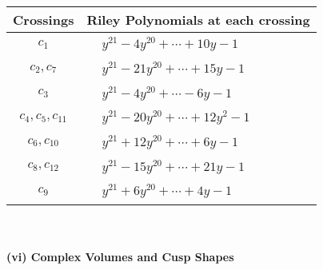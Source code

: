 \documentclass[1p]{elsarticle_modified}
\theoremstyle{definition}
\begin{document}
\begin{tabular}{m{50pt}|m{274pt}}
Crossings & \hspace{64pt}Riley Polynomials at each crossing \\
\hline $$\begin{aligned}c_{1}\end{aligned}$$&$\begin{aligned}
&y^{21}-4 y^{20}+\cdots+10 y-1
\end{aligned}$\\
\hline $$\begin{aligned}c_{2},c_{7}\end{aligned}$$&$\begin{aligned}
&y^{21}-21 y^{20}+\cdots+15 y-1
\end{aligned}$\\
\hline $$\begin{aligned}c_{3}\end{aligned}$$&$\begin{aligned}
&y^{21}-4 y^{20}+\cdots-6 y-1
\end{aligned}$\\
\hline $$\begin{aligned}c_{4},c_{5},c_{11}\end{aligned}$$&$\begin{aligned}
&y^{21}-20 y^{20}+\cdots+12 y^2-1
\end{aligned}$\\
\hline $$\begin{aligned}c_{6},c_{10}\end{aligned}$$&$\begin{aligned}
&y^{21}+12 y^{20}+\cdots+6 y-1
\end{aligned}$\\
\hline $$\begin{aligned}c_{8},c_{12}\end{aligned}$$&$\begin{aligned}
&y^{21}-15 y^{20}+\cdots+21 y-1
\end{aligned}$\\
\hline $$\begin{aligned}c_{9}\end{aligned}$$&$\begin{aligned}
&y^{21}+6 y^{20}+\cdots+4 y-1
\end{aligned}$\\
\hline
\end{tabular}\\~\\
\newpage\flushleft \textbf{(vi) Complex Volumes and Cusp Shapes}
\end{document}
